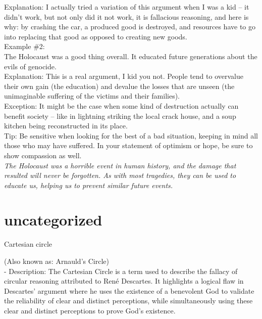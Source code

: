 \documentclass[a4paper,12pt,single,pdftex]{scrbook}
\begin{document}
    
      Explanation: I actually tried a variation of this argument when I was a kid -- it didn’t work, but not only did it not work, it is fallacious reasoning, and here is why: by crashing the car, a produced good is destroyed, and resources have to go into replacing that good as opposed to creating new goods.
    \\

    
      Example \#2:
    \\

    
      The Holocaust was a good thing overall.  It educated future generations about the evils of genocide.
    \\

    
      Explanation: This is a real argument, I kid you not.  People tend to overvalue their own gain (the education) and devalue the losses that are unseen (the unimaginable suffering of the victims and their families). 
    \\

    
      Exception: It might be the case when some kind of destruction actually can benefit society -- like in lightning striking the local crack house, and a soup kitchen being reconstructed in its place.
    \\

    
      Tip: Be sensitive when looking for the best of a bad situation, keeping in mind all those who may have suffered. In your statement of optimism or hope, be sure to show compassion as well.
    \\

    
      {\em The Holocaust was a horrible event in human history, and the damage that resulted will never be forgotten. As with most tragedies, they can be used to educate us, helping us to prevent similar future events.}
    \\

  \chapter{uncategorized
  }


Cartesian circle
    
      (Also known as: Arnauld's Circle)
    \\

  
    
      - Description: The Cartesian Circle is a term used to describe the fallacy of circular reasoning attributed to René Descartes. It highlights a logical flaw in Descartes' argument where he uses the existence of a benevolent God to validate the reliability of clear and distinct perceptions, while simultaneously using these clear and distinct perceptions to prove God's existence.
    \\
\end{document}
